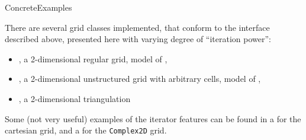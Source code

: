 \begin{Label}{ConcreteExamples}
\end{Label}

There are several grid classes implemented, 
that conform to the interface described above, 
presented here with varying degree of ``iteration power'':
\begin{itemize}
\item  {}, a 2-dimensional
  regular grid, model of ,
\item  {}, a  2-dimensional
  unstructured grid with arbitrary cells, model of ,
\item {}, a  2-dimensional triangulation
\end{itemize}
Some (not very useful) examples of the iterator features
can be found in a  
for the cartesian grid, 
and a  
for  the {\tt Complex2D} grid.
  